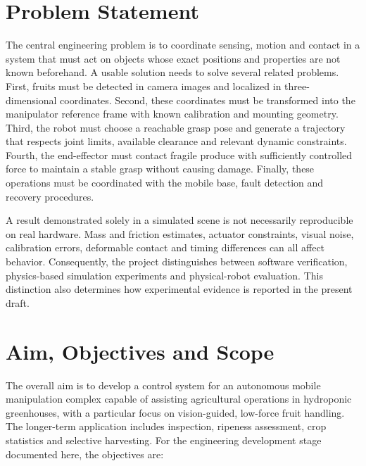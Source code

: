 \section{Problem Statement}
\label{sec:problem}

The central engineering problem is to coordinate sensing, motion and contact in a system
that must act on objects whose exact positions and properties are not known beforehand.
A usable solution needs to solve several related problems. First, fruits must be detected
in camera images and localized in three-dimensional coordinates. Second, these coordinates
must be transformed into the manipulator reference frame with known calibration and
mounting geometry. Third, the robot must choose a reachable grasp pose and generate a
trajectory that respects joint limits, available clearance and relevant dynamic
constraints. Fourth, the end-effector must contact fragile produce with sufficiently
controlled force to maintain a stable grasp without causing damage. Finally, these
operations must be coordinated with the mobile base, fault detection and recovery
procedures.

A result demonstrated solely in a simulated scene is not necessarily reproducible on
real hardware. Mass and friction estimates, actuator constraints, visual noise,
calibration errors, deformable contact and timing differences can all affect behavior.
Consequently, the project distinguishes between software verification, physics-based
simulation experiments and physical-robot evaluation. This distinction also determines
how experimental evidence is reported in the present draft.

\section{Aim, Objectives and Scope}
\label{sec:objectives}

The overall aim is to develop a control system for an autonomous mobile manipulation
complex capable of assisting agricultural operations in hydroponic greenhouses, with a
particular focus on vision-guided, low-force fruit handling. The longer-term application
includes inspection, ripeness assessment, crop statistics and selective harvesting.
For the engineering development stage documented here, the objectives are:

